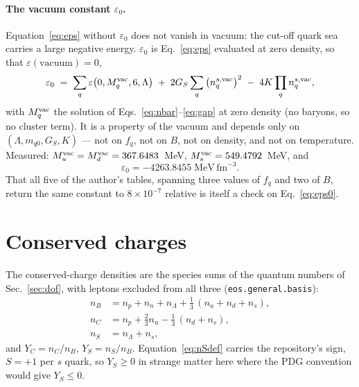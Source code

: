 \documentclass[aps,prc,onecolumn,superscriptaddress,nofootinbib,10pt]{revtex4-2}
\newcommand{\nB}{n_B}
\newcommand{\nC}{n_C}
\newcommand{\nS}{n_S}
\begin{document}
\paragraph{The vacuum constant $\varepsilon_0$.} Equation~\eqref{eq:eps}
without $\varepsilon_0$ does not vanish in vacuum: the cut-off quark sea
carries a large negative energy. $\varepsilon_0$ is Eq.~\eqref{eq:eps}
evaluated at zero density, so that $\varepsilon(\text{vacuum}) = 0$,
%
\begin{equation}
\varepsilon_0 \;=\; \sum_q \varepsilon\big(0, M_q^{\rm vac}, 6, \Lambda\big)
  \;+\; 2 G_S \sum_q \big(n^{s,{\rm vac}}_q\big)^2
  \;-\; 4 K \prod_q n^{s,{\rm vac}}_q ,
\label{eq:eps0}
\end{equation}
%
with $M_q^{\rm vac}$ the solution of Eqs.~\eqref{eq:nbar}--\eqref{eq:gap} at
zero density (no baryons, so no cluster term). It is a property of the vacuum
and depends only on $(\Lambda, m_{q0}, G_S, K)$ --- not on $f_q$, not on $B$,
not on density, and not on temperature. Measured:
$M_u^{\rm vac} = M_d^{\rm vac} = 367.6483$~MeV,
$M_s^{\rm vac} = 549.4792$~MeV, and
%
\begin{equation}
\varepsilon_0 = -4263.8455\;\mathrm{MeV\,fm^{-3}} .
\label{eq:eps0value}
\end{equation}
%
That all five of the author's tables, spanning three values of $f_q$ and two
of $B$, return the same constant to $8\times10^{-7}$ relative is itself a
check on Eq.~\eqref{eq:eps0}.

\section{Conserved charges}
\label{sec:charges}

The conserved-charge densities are the species sums of the quantum numbers of
Sec.~\ref{sec:dof}, with leptons excluded from all three
(\texttt{eos.general.basis}):
%
\begin{align}
\nB &= n_p + n_n + n_\Lambda + \tfrac13\,(n_u + n_d + n_s) ,
\label{eq:nB}\\
\nC &= n_p + \tfrac23 n_u - \tfrac13\,(n_d + n_s) ,
\label{eq:nCdef}\\
\nS &= n_\Lambda + n_s ,
\label{eq:nSdef}
\end{align}
%
and $Y_C = \nC/\nB$, $Y_S = \nS/\nB$. Equation~\eqref{eq:nSdef} carries the
repository's sign, $S = +1$ per $s$ quark, so $Y_S \ge 0$ in strange matter
here where the PDG convention would give $Y_S \le 0$.
\end{document}
